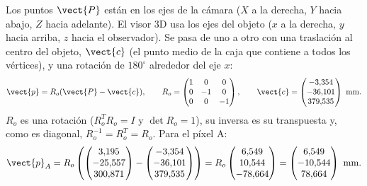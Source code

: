 Los puntos $\vect{P}$ están en los ejes de la cámara ($X$ a la derecha, $Y$ hacia abajo, $Z$ hacia adelante). El visor 3D usa los ejes
del objeto ($x$ a la derecha, $y$ hacia arriba, $z$ hacia el observador). Se pasa de uno a otro con una traslación al centro del
objeto, $\vect{c}$ (el punto medio de la caja que contiene a todos los vértices), y una rotación de $180^\circ$ alrededor del eje $x$:
\begin{equation}
\vect{p}=R_o(\vect{P}-\vect{c}),\qquad R_o=\begin{pmatrix} 1 & 0 & 0 \\ 0 & -1 & 0 \\ 0 & 0 & -1 \end{pmatrix},\qquad \vect{c}=\begin{pmatrix} -3{,}354 \\ -36{,}101 \\ 379{,}535 \end{pmatrix}\ \text{mm}.
\end{equation}
$R_o$ es una rotación ($R_o^TR_o=I$ y $\det R_o=1$), su inversa es su transpuesta y, como es diagonal, $R_o^{-1}=R_o^T=R_o$. Para el píxel A:
\begin{equation}
\vect{p}_A=R_o\left(\begin{pmatrix} 3{,}195 \\ -25{,}557 \\ 300{,}871 \end{pmatrix}-\begin{pmatrix} -3{,}354 \\ -36{,}101 \\ 379{,}535 \end{pmatrix}\right)=R_o\begin{pmatrix} 6{,}549 \\ 10{,}544 \\ -78{,}664 \end{pmatrix}=\begin{pmatrix} 6{,}549 \\ -10{,}544 \\ 78{,}664 \end{pmatrix}\ \text{mm}.
\end{equation}

